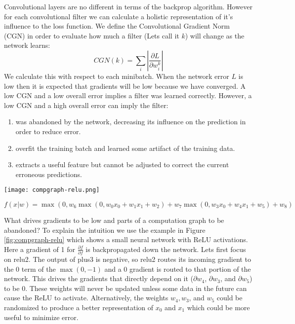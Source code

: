 \documentclass{article}
\begin{document}
	Convolutional layers are no different in terms of the backprop algorithm. However for each convolutional filter we can calculate a holistic representation of it's influence to the loss function. We define the Convolutional Gradient Norm (CGN) in order to evaluate how much a filter (Lets call it $k$) will change as the network learns:
%
$$CGN(k) = \sum_{i} \left|\frac{\partial L}{\partial w^k_i}\right|$$%
%
We calculate this with respect to each minibatch. When the network error $L$ is low then it is expected that gradients will be low because we have converged. A low CGN and a low overall error implies a filter was learned correctly. However, a low CGN and a high overall error can imply the filter: 


\vspace{-10pt}
\begin{enumerate}
  \item was abandoned by the network, decreasing its influence on the prediction in order to reduce error.
  \item overfit the training batch and learned some artifact of the training data. 
  \item extracts a useful feature but cannot be adjusted to correct the current erroneous predictions.
\end{enumerate}
	
	
	
\begin{figure*}
  \begin{center}
    \texttt{[image: compgraph-relu.png]}
    
    $f(x|w) = \max(0, w_6 \max(0,w_0x_0 + w_1x_1 + w_2) +  w_7 \max(0,w_3x_0 + w_4x_1 + w_5) + w_8)$
     \caption{The function $f(x|w)$ is decomposed into its computation graph. Edges represent the output of inputs and each intermediate computation. Gradients $\frac{\partial f}{\partial w}$ are shown inside the boxes of the inputs and weights.}
      \label{fig:compgraph-relu}
  \end{center}
\end{figure*}
	
What drives gradients to be low and parts of a computation graph to be abandoned? To explain the intuition we use the example in Figure \ref{fig:compgraph-relu} %
which shows a small neural network with ReLU activations. Here a gradient of 1 for $\frac{\partial f}{\partial f}$ is backpropagated down the network. Lets first focus on relu2. The output of plus3 is negative, so relu2 routes its incoming gradient to the 0 term of the $\max(0,-1)$ and a 0 gradient is routed to that portion of the network. This drives the gradients that directly depend on it ($\partial w_4$, $\partial w_3$, and $\partial w_5$) to be 0. These weights will never be updated unless some data in the future can cause the ReLU to activate. Alternatively, the weights $w_4, w_3$, and $w_5$ could be randomized to produce a better representation of $x_0$ and $x_1$ which could be more useful to minimize error.
\end{document}
